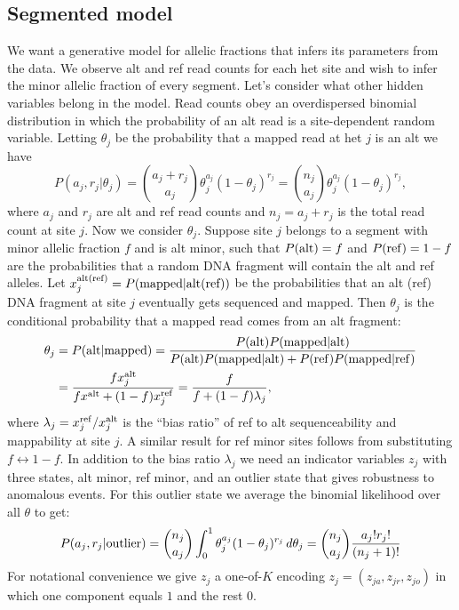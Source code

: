 \documentclass[nofootinbib,amssymb,amsmath]{revtex4}
\begin{document}
\subsection{Segmented model} \label{segmented-model}
We want a generative model for allelic fractions that infers its parameters from the data.  We observe alt and ref read counts for each het site and wish to infer the minor allelic fraction of every segment.  Let's consider what other hidden variables belong in the model.  Read counts obey an overdispersed binomial distribution in which the probability of an alt read is a site-dependent random variable.  Letting $\theta_j$ be the probability that a mapped read at het $j$ is an alt we have
%
\begin{equation}
P(a_j, r_j | \theta_j) =  \binom{a_j + r_j}{a_j} \theta_j^{a_j} (1-\theta_j)^{r_j} = \binom{n_j}{a_j} \theta_j^{a_j} (1-\theta_j)^{r_j},
\end{equation}
where $a_j$ and $r_j$ are alt and ref read counts and $n_j = a_j + r_j$ is the total read count at site $j$.  Now we consider $\theta_j$.  Suppose site $j$ belongs to a segment with minor allelic fraction $f$ and is alt minor, such that $P({\rm alt}) = f$ and $P({\rm ref}) = 1 - f$ are the probabilities that a random DNA fragment will contain the alt and ref alleles.  Let $x^{\rm alt (ref)}_j = P({\rm mapped} | {\rm alt (ref)})$ be the probabilities that an alt (ref) DNA fragment at site $j$ eventually gets sequenced and mapped.  Then $\theta_j$ is the conditional probability that a mapped read comes from an alt fragment:
%
\begin{align}
\theta_j  &= P( {\rm alt} | {\rm mapped} ) = \frac { P( {\rm alt} ) P( {\rm mapped} | {\rm alt} ) } { P( {\rm alt} ) P( {\rm mapped} | {\rm alt} ) + P( {\rm ref} ) P( {\rm mapped} | {\rm ref} ) } \\
 &= \frac{f x^{\rm alt}_j }{fx^{\rm alt} + (1-f) x^{\rm ref}_j } = \frac{f}{f + (1-f) \lambda_j},
\end{align}
%
where $\lambda_j = x^{\rm ref}_j / x^{\rm alt}_j$ is the ``bias ratio'' of ref to alt sequenceability and mappability at site $j$.  A similar result for ref minor sites follows from substituting $f \leftrightarrow 1 - f$.  In addition to the bias ratio $\lambda_j$ we need an indicator variables $z_j$ with three states, alt minor, ref minor, and an outlier state that gives robustness to anomalous events.  For this outlier state we average the binomial likelihood over all $\theta$ to get:
%
\begin{align}
P(a_j, r_j | {\rm outlier}) = \binom{n_j}{a_j} \int_0^1 \theta_j^{a_j} (1-\theta_j)^{r_j} \, d \theta_j 
= \binom{n_j}{a_j} \frac{a_j! r_j!}{(n_j + 1)!}
\end{align}
%
For notational convenience we give $z_j$ a one-of-$K$ encoding $z_j = (z_{ja}, z_{jr}, z_{jo})$ in which one component equals $1$ and the rest $0$.
\end{document}
